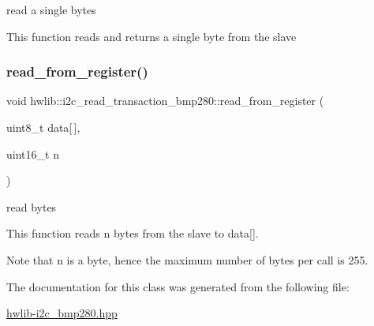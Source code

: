 read a single bytes

This function reads and returns a single byte from the slave \mbox{\label{classhwlib_1_1i2c__read__transaction__bmp280_a1105511aec269220328b3b64bf72521a}} 
\subsubsection{\texorpdfstring{read\_from\_register()}{read\_from\_register()}}
{\footnotesize\ttfamily void hwlib\+::i2c\+\_\+read\+\_\+transaction\+\_\+bmp280\+::read\+\_\+from\+\_\+register (\begin{DoxyParamCaption}\item[{uint8\+\_\+t}]{data\mbox{[}$\,$\mbox{]},  }\item[{uint16\+\_\+t}]{n }\end{DoxyParamCaption})\hspace{0.3cm}{\ttfamily [inline]}}

read bytes

This function reads n bytes from the slave to data\mbox{[}\mbox{]}.

Note that n is a byte, hence the maximum number of bytes per call is 255. 

The documentation for this class was generated from the following file\+:\begin{DoxyCompactItemize}
\item 
\mbox{\hyperlink{hwlib-i2c__bmp280_8hpp}{hwlib-\/i2c\+\_\+bmp280.\+hpp}}\end{DoxyCompactItemize}
